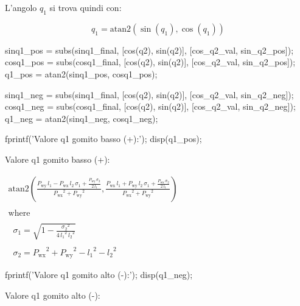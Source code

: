 \documentclass[11pt, a4paper]{article}
\begin{document}
\begin{par}
\begin{flushleft}
L'angolo $q_1$ si trova quindi con:
\end{flushleft}
\end{par}

\[
    q_1 =\textrm{atan2}(\sin (q_1 ),\cos (q_1 ))
\]

\begin{matlabcode}
sinq1_pos = subs(sinq1_final, [cos(q2), sin(q2)], [cos_q2_val, sin_q2_pos]);
cosq1_pos = subs(cosq1_final, [cos(q2), sin(q2)], [cos_q2_val, sin_q2_pos]);
q1_pos = atan2(sinq1_pos, cosq1_pos);

sinq1_neg = subs(sinq1_final, [cos(q2), sin(q2)], [cos_q2_val, sin_q2_neg]);
cosq1_neg = subs(cosq1_final, [cos(q2), sin(q2)], [cos_q2_val, sin_q2_neg]);
q1_neg = atan2(sinq1_neg, cosq1_neg);

fprintf('Valore q1 gomito basso (+):\n');
disp(q1_pos);
\end{matlabcode}
\newpage
\begin{matlaboutput}
Valore q1 gomito basso (+):
\end{matlaboutput}
\begin{matlabsymbolicoutput}
$\displaystyle \begin{array}{l}
\textrm{atan2}\left(\frac{P_{\textrm{wy}} \,l_1 -P_{\textrm{wx}} \,l_2 \,\sigma_1 +\frac{P_{\textrm{wy}} \,\sigma_2 }{2\,l_1 }}{{P_{\textrm{wx}} }^2 +{P_{\textrm{wy}} }^2 },\frac{P_{\textrm{wx}} \,l_1 +P_{\textrm{wy}} \,l_2 \,\sigma_1 +\frac{P_{\textrm{wx}} \,\sigma_2 }{2\,l_1 }}{{P_{\textrm{wx}} }^2 +{P_{\textrm{wy}} }^2 }\right)\\
\mathrm{}\\
\textrm{where}\\
\mathrm{}\\
\;\;\sigma_1 =\sqrt{1-\frac{{\sigma_2 }^2 }{4\,{l_1 }^2 \,{l_2 }^2 }}\\
\mathrm{}\\
\;\;\sigma_2 ={P_{\textrm{wx}} }^2 +{P_{\textrm{wy}} }^2 -{l_1 }^2 -{l_2 }^2
\end{array}$
\end{matlabsymbolicoutput}
\begin{matlabcode}
fprintf('Valore q1 gomito alto (-):\n');
disp(q1_neg);
\end{matlabcode}
\begin{matlaboutput}
Valore q1 gomito alto (-):
\end{matlaboutput}
\end{document}
